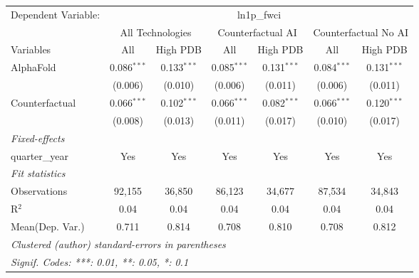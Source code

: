 \begingroup
\centering
\begin{tabular}{lcccccc}
   \tabularnewline \midrule \midrule
   Dependent Variable: & \multicolumn{6}{c}{ln1p\_fwci}\\
 & \multicolumn{2}{c}{All Technologies} & \multicolumn{2}{c}{Counterfactual AI} & \multicolumn{2}{c}{Counterfactual No AI} \\
\cmidrule(lr){1-1}\cmidrule(lr){2-3} \cmidrule(lr){4-5} \cmidrule(lr){6-7}
Variables & \multicolumn{1}{c}{All} & \multicolumn{1}{c}{High PDB} & \multicolumn{1}{c}{All} & \multicolumn{1}{c}{High PDB} & \multicolumn{1}{c}{All} & \multicolumn{1}{c}{High PDB} \\
\cmidrule(lr){1-1}\cmidrule(lr){2-2} \cmidrule(lr){3-3} \cmidrule(lr){4-4} \cmidrule(lr){5-5} \cmidrule(lr){6-6} \cmidrule(lr){7-7}
   AlphaFold      & 0.086$^{***}$ & 0.133$^{***}$ & 0.085$^{***}$ & 0.131$^{***}$ & 0.084$^{***}$ & 0.131$^{***}$\\   
                  & (0.006)       & (0.010)       & (0.006)       & (0.011)       & (0.006)       & (0.011)\\   
   Counterfactual & 0.066$^{***}$ & 0.102$^{***}$ & 0.066$^{***}$ & 0.082$^{***}$ & 0.066$^{***}$ & 0.120$^{***}$\\   
                  & (0.008)       & (0.013)       & (0.011)       & (0.017)       & (0.010)       & (0.017)\\   
   \midrule
   \emph{Fixed-effects}\\
   quarter\_year  & Yes           & Yes           & Yes           & Yes           & Yes           & Yes\\  
   \midrule
   \emph{Fit statistics}\\
   Observations   & 92,155        & 36,850        & 86,123        & 34,677        & 87,534        & 34,843\\  
   R$^2$          & 0.04          & 0.04          & 0.04          & 0.04          & 0.04          & 0.04\\  
Mean(Dep. Var.) & 0.711 & 0.814 & 0.708 & 0.810 & 0.708 & 0.812 \\
   \midrule \midrule
   \multicolumn{7}{l}{\emph{Clustered (author) standard-errors in parentheses}}\\
   \multicolumn{7}{l}{\emph{Signif. Codes: ***: 0.01, **: 0.05, *: 0.1}}\\
\end{tabular}
\par\endgroup
